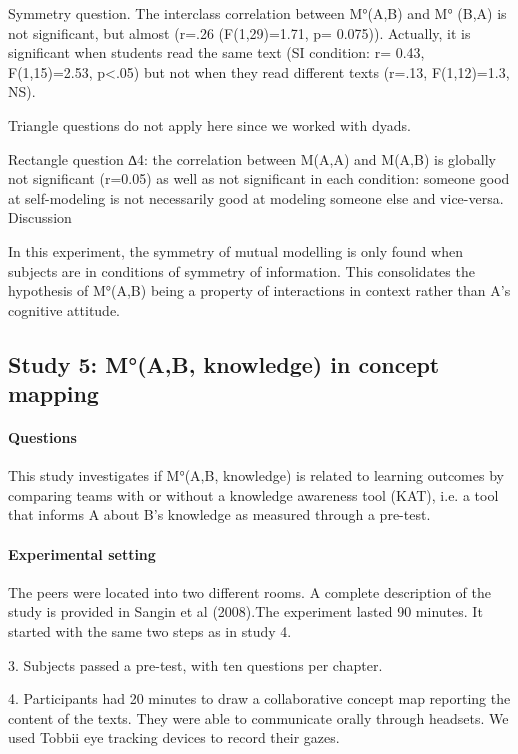 \documentclass[twocolumn]{article}
\begin{document}
Symmetry question. The interclass correlation between M°(A,B) and M° (B,A) is
not significant, but almost (r=.26 (F(1,29)=1.71, p= 0.075)). Actually, it is
significant when students read the same text (SI condition: r= 0.43,
F(1,15)=2.53, p<.05) but not when they read different texts (r=.13, F(1,12)=1.3,
NS). 

Triangle questions do not apply here since we worked with dyads.

Rectangle question ∆4: the correlation between M(A,A) and M(A,B) is globally not
significant (r=0.05) as well as not significant in each condition: someone good
at self-modeling is not necessarily good at modeling someone else and
vice-versa.  Discussion

In this experiment, the symmetry of mutual modelling is only found when subjects
are in conditions of symmetry of information. This consolidates the hypothesis
of M°(A,B) being a property of interactions in context rather than A's cognitive
attitude.

\subsection{Study 5:  M°(A,B, knowledge)  in concept mapping}

\paragraph{Questions}

This study investigates if M°(A,B, knowledge) is related to learning outcomes by
comparing teams with or without a knowledge awareness tool (KAT), i.e. a tool
that informs A about B's knowledge as measured through a pre-test.

\paragraph{Experimental setting}

The peers were located into two different rooms. A complete description of the
study is provided in Sangin et al (2008).The experiment lasted 90 minutes. It
started with the same two steps as in study 4.

3. Subjects passed a pre-test, with ten questions per chapter. 

4. Participants had 20 minutes to draw a collaborative concept map reporting the
content of the texts. They were able to communicate orally through headsets.  We
used Tobbii eye tracking devices to record their gazes.
\end{document}
